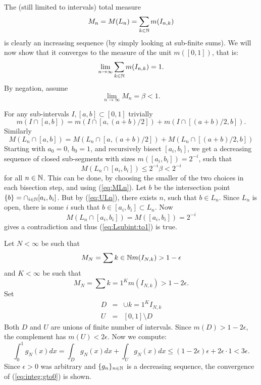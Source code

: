 \begin{enumerate}
The (still limited to intervals) total measure
\begin{equation}
 M_n = M(L_n) =\sum_{k\in \mathbb{N}} m(I_{n,k})
\end{equation}
is clearly an increasing sequence (by simply looking at sub-finite sums).
We will now show that it
converges to the measure of the unit \(m([0,1])\), that is:
\begin{equation} \label{eq:Lsubint:to1}
 \lim_{n\to\infty} \sum_{k\in \mathbb{N}} m(I_{n,k}) = 1.
\end{equation}
By negation, assume
\begin{equation*}
 \lim_{n\to\infty} M_n = \beta < 1.
\end{equation*}

For any sub-intervals \(I,[a,b]\subset [0,1]\)
trivially
\begin{equation*}
m(I\cap[a,b]) = m(I\cap[a,(a+b)/2]) + m(I\cap[(a+b)/2, b]).
\end{equation*}
Similarly
\begin{equation} \label{eq:MLn}
 M(L_n \cap [a,b]) =  M(L_n \cap [a,(a+b)/2]) + M(L_n\cap[(a+b)/2, b])
\end{equation}
Starting with \(a_0=0\), \(b_0=1\), and recursively bisect \([a_i,b_i]\),
we get a decreasing sequence of closed sub-segments with sizes
\(m([a_i,b_i]) = 2^{-i}\),
such that
\begin{equation*}
 M(L_n \cap [a_i,b_i]) \leq 2^{-i}\beta < 2^{-i}
\end{equation*}
for all \(n\in\mathbb{N}\).
This can be done, by choosing the smaller of the two choices
in each bisection step, and using (\ref{eq:MLn}).
Let $b$ be the intersection point \(\{b\} = \cap_{i\in\mathbb{N}} [a_i,b_i]\).
But by (\ref{eq:ULn}), there exists $n$, such that \(b\in L_n\).
Since \(L_n\) is open, there is some $i$ such that \(b\in[a_i,b_i]\subset L_n\).
Now
\begin{equation*}
M(L_n \cap [a_i,b_i]) = M([a_i,b_i]) = 2^{-i}
\end{equation*}
gives a contradiction and thus (\ref{eq:Lsubint:to1}) is true.

Let \(N<\infty\) be such that
\begin{equation*}
M_N = \sum{k\in \ensuremath{\mathbb{N}}} m(I_{N,k}) > 1 - \epsilon
\end{equation*}
and \(K<\infty\) be such that
\begin{equation*}
M_N = \sum{k=1}^K m(I_{N,k}) > 1 - 2\epsilon.
\end{equation*}
Set
\begin{eqnarray*}
  D & = & \cup{k=1}^K I_{N,k} \\
  U & = & [0,1] \setminus D
\end{eqnarray*}
Both $D$ and $U$ are unions of finite number of intervals.
Since \(m(D) > 1 - 2\epsilon\), the complement has \(m(U) < 2\epsilon\).
Now we compute:
\begin{equation*}
\int_0^1 g_N(x)dx = \int_D g_N(x)dx + \int_U g_N(x)dx
 \leq (1-2\epsilon)\epsilon + 2\epsilon\cdot 1 < 3\epsilon.
\end{equation*}
Since \(\epsilon>0\) was arbitrary and
\(\{g_n\}_{n\in\mathbb{N}}\) is a decreasing sequence,
the convergence of (\ref{eq:integ:gto0}) is shown.



\end{enumerate}
